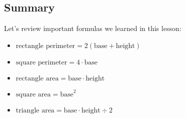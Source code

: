 \subsection{Summary}
Let's review important formulas we learned in this lesson:

\begin{itemize}
\item $\text{rectangle perimeter} = 2(\text{base}+\text{height})$
\item $\text{square perimeter} = 4 \cdot \text{base}$
\item $\text{rectangle area}=\text{base} \cdot \text{height}$
\item $\text{square area}=\text{base}^{2} $
\item $\text{triangle area}=\text{base} \cdot \text{height} \div2$
\end{itemize}

